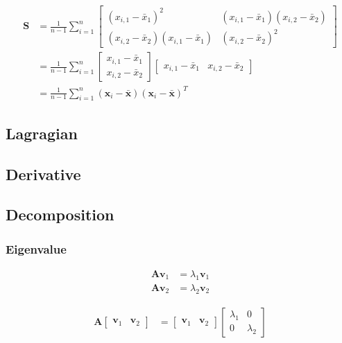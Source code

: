 \documentclass{article}
\begin{document}
\begin{align}
	\mathbf{S} & =\frac{1}{n-1}\sum_{i=1}^{n}\left[\begin{array}{cc}
		\left(x_{i,1}-\bar{x}_{1}\right)^{2} & \left(x_{i,1}-\bar{x}_{1}\right)\left(x_{i,2}-\bar{x}_{2}\right)\\
		\left(x_{i,2}-\bar{x}_{2}\right)\left(x_{i,1}-\bar{x}_{1}\right) & \left(x_{i,2}-\bar{x}_{2}\right)^{2}
	\end{array}\right]\\
	& =\frac{1}{n-1}\sum_{i=1}^{n}\left[\begin{array}{c}
		x_{i,1}-\bar{x}_{1}\\
		x_{i,2}-\bar{x}_{2}
	\end{array}\right]\left[\begin{array}{cc}
		x_{i,1}-\bar{x}_{1} & x_{i,2}-\bar{x}_{2}\end{array}\right]\\
	& =\frac{1}{n-1}\sum_{i=1}^{n}\left(\mathbf{x}_{i}-\bar{\mathbf{x}}\right)\left(\mathbf{x}_{i}-\bar{\mathbf{x}}\right)^{T}
\end{align}

\subsection{Lagragian}

\subsection{Derivative}

\subsection{Decomposition}

\subsubsection{Eigenvalue}

\begin{align}
	\mathbf{A}\mathbf{v}_{1} & =\lambda_{1}\mathbf{v}_{1}\\
	\mathbf{A}\mathbf{v}_{2} & =\lambda_{2}\mathbf{v}_{2}
\end{align}

\begin{align}
	\mathbf{A}\left[\begin{array}{cc}
		\mathbf{v}_{1} & \mathbf{v}_{2}\end{array}\right] & =\left[\begin{array}{cc}
		\mathbf{v}_{1} & \mathbf{v}_{2}\end{array}\right]\left[\begin{array}{cc}
		\lambda_{1} & 0\\
		0 & \lambda_{2}
	\end{array}\right]
\end{align}
\end{document}
